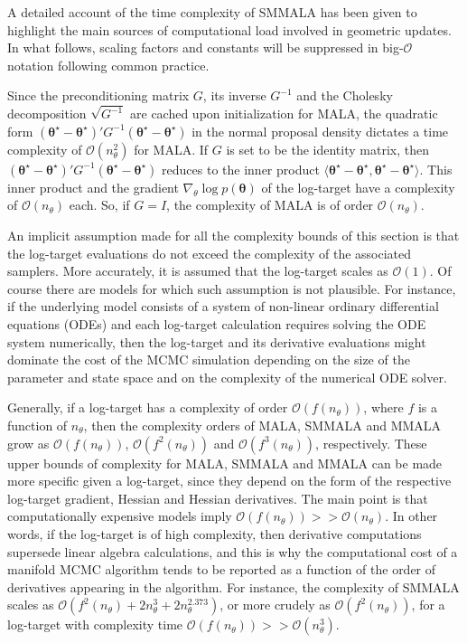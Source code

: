 \documentclass[twoside,11pt]{article}
\begin{document}
A detailed account of the time complexity of SMMALA has been given to highlight the main sources of computational load
involved in geometric updates. In what follows, scaling factors and constants will be suppressed in big-$\mathcal{O}$ 
notation following common practice.

Since the preconditioning matrix $G$, its inverse $G^{-1}$ and the Cholesky decomposition $\sqrt{G^{-1}}$ are cached upon 
initialization for MALA, the quadratic form
$
(\boldsymbol{\theta}^{\star}-\boldsymbol{\theta}^{\star})'
G^{-1}
(\boldsymbol{\theta}^{\star}-\boldsymbol{\theta}^{\star})
$
in the normal proposal density dictates a time complexity of $\mathcal{O}(n_{\theta}^2)$ for MALA. If $G$ is set to be the 
identity matrix, then
$
(\boldsymbol{\theta}^{\star}-\boldsymbol{\theta}^{\star})'
G^{-1}
(\boldsymbol{\theta}^{\star}-\boldsymbol{\theta}^{\star})
$
reduces to the inner product
$
\langle\boldsymbol{\theta}^{\star}-\boldsymbol{\theta}^{\star},
\boldsymbol{\theta}^{\star}-\boldsymbol{\theta}^{\star}\rangle
$. This inner product and the gradient $\nabla_{\theta}\log{p(\boldsymbol{\theta})}$  of the log-target have a complexity of 
$\mathcal{O}(n_{\theta})$ each. So, if $G=I$, the complexity of MALA is of order $\mathcal{O}(n_{\theta})$.

An implicit assumption made for all the complexity bounds of this section is that the log-target evaluations do not
exceed the complexity of the associated samplers. More accurately, it is assumed that the log-target scales as
$\mathcal{O}(1)$. Of course there are models for which such assumption is not plausible. For instance, if the underlying 
model consists of a system of non-linear ordinary differential equations (ODEs) and each log-target calculation requires 
solving the ODE system numerically, then the log-target and its derivative evaluations might dominate the cost of the MCMC 
simulation depending on the size of the parameter and state space and on the complexity of the numerical ODE solver.

Generally, if a log-target has a complexity of order $\mathcal{O}(f(n_{\theta}))$, where $f$ is a function of $n_{\theta}$, 
then the complexity orders of MALA, SMMALA and MMALA grow as $\mathcal{O}(f(n_{\theta}))$, $\mathcal{O}(f^2(n_{\theta}))$ 
and $\mathcal{O}(f^3(n_{\theta}))$, respectively. These upper bounds of complexity for MALA, SMMALA and MMALA can be made 
more specific given a log-target, since they depend on the form of the respective log-target gradient, Hessian and Hessian
derivatives. The main point is that computationally expensive models imply 
$\mathcal{O}(f(n_{\theta}))>>\mathcal{O}(n_{\theta})$. In other words, if the log-target is of high complexity, then
derivative computations supersede linear algebra calculations, and this is why the computational cost of a manifold MCMC
algorithm tends to be reported as a function of the order of derivatives appearing in the algorithm. For instance, the
complexity of SMMALA scales as $\mathcal{O}(f^2(n_{\theta})+2n_\theta^3+2n_\theta^{2.373})$, or more crudely as
$\mathcal{O}(f^2(n_{\theta}))$, for a log-target with complexity time
$\mathcal{O}(f(n_{\theta}))>>\mathcal{O}(n_{\theta}^3)$.
\end{document}
